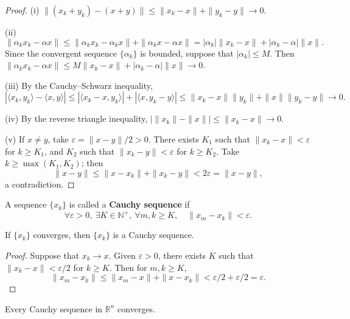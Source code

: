 \begin{proof}
(i) $\|(x_k + y_k) - (x + y)\| \le \|x_k - x\| + \|y_k - y\| \to 0$.

(ii)
\[
\|\alpha_k x_k - \alpha x\| \le \|\alpha_k x_k - \alpha_k x\| + \|\alpha_k x - \alpha x\| = |\alpha_k| \|x_k - x\| + |\alpha_k - \alpha| \|x\|.
\]
Since the convergent sequence $\{\alpha_k\}$ is bounded, suppose that $|\alpha_k| \le M$. Then $\|\alpha_k x_k - \alpha x\| \le M \|x_k - x\| + |\alpha_k - \alpha| \|x\| \to 0$.

(iii) By the Cauchy--Schwarz inequality,
\[
|\langle x_k, y_k \rangle - \langle x, y \rangle| \le |\langle x_k - x, y_k \rangle| + |\langle x, y_k - y \rangle| \le \|x_k - x\| \|y_k\| + \|x\| \|y_k - y\| \to 0.
\]

(iv) By the reverse triangle inequality, $| \|x_k\| - \|x\| | \le \|x_k - x\| \to 0$.

(v) If $x \neq y$, take $\varepsilon = \|x - y\|/2 > 0$. There exists $K_1$ such that $\|x_k - x\| < \varepsilon$ for $k \ge K_1$, and $K_2$ such that $\|x_k - y\| < \varepsilon$ for $k \ge K_2$. Take $k \ge \max(K_1, K_2)$; then
\[
\|x - y\| \le \|x - x_k\| + \|x_k - y\| < 2\varepsilon = \|x - y\|,
\]
a contradiction.
\end{proof}

\begin{definition}\label{def:cauchy_sequence}
A sequence $\{x_k\}$ is called a \textbf{Cauchy sequence} if
\[
\forall \varepsilon > 0,\ \exists K \in \mathbb{N}^+,\ \forall m, k \ge K,\quad \|x_m - x_k\| < \varepsilon.
\]
\end{definition}

\begin{proposition}\label{prop:convergent_cauchy_ra}
If $\{x_k\}$ converges, then $\{x_k\}$ is a Cauchy sequence.
\end{proposition}

\begin{proof}
Suppose that $x_k \to x$. Given $\varepsilon > 0$, there exists $K$ such that $\|x_k - x\| < \varepsilon/2$ for $k \ge K$. Then for $m, k \ge K$,
\[
\|x_m - x_k\| \le \|x_m - x\| + \|x - x_k\| < \varepsilon/2 + \varepsilon/2 = \varepsilon.
\]
\end{proof}

\begin{theorem}\label{thm:rn_completeness}
Every Cauchy sequence in $\mathbb{R}^n$ converges.
\end{theorem}

